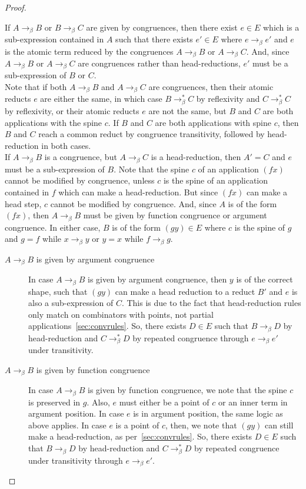 \documentclass{lmcs}
\newcommand{\arr}{\rightarrow}
\newcommand{\barr}{\arr_{\beta}}
\begin{document}
\begin{proof}
\begin{description}
        If \(A \barr B\) or \(B \barr C\) are given by congruences, then there exist \(e \in E\) which is a sub-expression contained in \(A\) such that there exists \(e' \in E\) where \(e \barr e'\) and \(e\) is the atomic term reduced by the congruences \(A \barr B\) or \(A \barr C\). And, since \(A \barr B\) or \(A \barr C\) are congruences rather than head-reductions, \(e'\) must be a sub-expression of \(B\) or \(C\).\\

        Note that if both \(A \barr B\) and \(A \barr C\) are congruences, then their atomic reducts \(e\) are either the same, in which case \(B \barr^{*} C\) by reflexivity and \(C \barr^{*} C\) by reflexivity, or their atomic reducts \(e\) are not the same, but \(B\) and \(C\) are both applications with the spine \(c\). If \(B\) and \(C\) are both applications with spine \(c\), then \(B\) and \(C\) reach a common reduct by congruence transitivity, followed by head-reduction in both cases.\\

        If \(A \barr B\) is a congruence, but \(A \barr C\) is a head-reduction, then \(A' = C\) and \(e\) must be a sub-expression of \(B\). Note that the spine \(c\) of an application \((f x)\) cannot be modified by congruence, unless \(c\) is the spine of an application contained in \(f\) which can make a head-reduction. But since \((f x)\) can make a head step, \(c\) cannot be modified by congruence. And, since \(A\) is of the form \((f x)\), then \(A \barr B\) must be given by function congruence or argument congruence. In either case, \(B\) is of the form \((g y) \in E\) where \(c\) is the spine of \(g\) and \(g = f\) while \(x \barr y\) or \(y = x\) while \(f \barr g\).

        \begin{description}
          \item[\(A \barr B\) is given by argument congruence]
            In case \(A \barr B\) is given by argument congruence, then \(y\) is of the correct shape, such that \((g y)\) can make a head reduction to a reduct \(B'\) and \(e\) is also a sub-expression of \(C\). This is due to the fact that head-reduction rules only match on combinators with points, not partial applications~\ref{sec:convrules}. So, there exists \(D \in E\) such that \(B \barr D\) by head-reduction and \(C \barr^{*} D\) by repeated congruence through \(e \barr e'\) under transitivity.
          \item[\(A \barr B\) is given by function congruence]
            In case \(A \barr B\) is given by function congruence, we note that the spine \(c\) is preserved in \(g\). Also, \(e\) must either be a point of \(c\) or an inner term in argument position. In case \(e\) is in argument position, the same logic as above applies. In case \(e\) is a point of \(c\), then, we note that \((g y)\) can still make a head-reduction, as per~\ref{sec:convrules}. So, there exists \(D \in E\) such that \(B \barr D\) by head-reduction and \(C \barr^{*} D\) by repeated congruence under transitivity through \(e \barr e'\).
          \end{description}


\end{description}
\end{proof}
\end{document}
